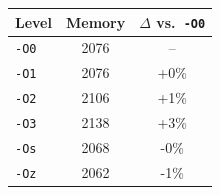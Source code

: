 \begin{tabular*}{\columnwidth}{@{\extracolsep\fill}lcc@{\extracolsep\fill}}
\toprule
\textbf{Level} & \textbf{Memory} & \textbf{$\Delta$ vs.\ \texttt{-O0}} \\
\midrule
\texttt{-O0} & 2076 & -- \\
\texttt{-O1} & 2076 & +0\% \\
\texttt{-O2} & 2106 & +1\% \\
\texttt{-O3} & 2138 & +3\% \\
\texttt{-Os} & 2068 & -0\% \\
\texttt{-Oz} & 2062 & -1\% \\
\bottomrule
\end{tabular*}
